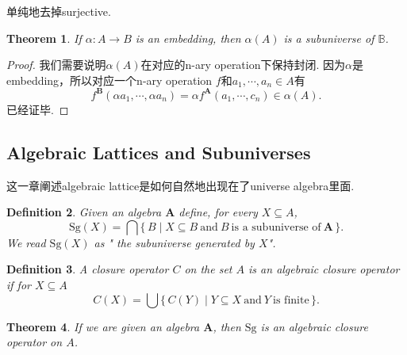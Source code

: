 \documentclass{article}
\newtheorem{theorem}{Theorem}[section]
\newtheorem{definition}[theorem]{Definition}
\newcommand*{\xfunc}[4]{{#2}\colon{#3}{#1}{#4}}
\newcommand*{\func}[3]{\xfunc{\to}{#1}{#2}{#3}}
\newcommand\Set[2]{\{\,#1\mid#2\,\}} %
\newcommand\Sg{\text{Sg}}
\begin{document}
{\color{blue} 单纯地去掉surjective.}

\begin{theorem}
\rm If $\func{\alpha}{A}{B}$ is an embedding, then $\alpha(A)$ is a subuniverse of $\mathbb{B}$.
\end{theorem}

\begin{proof}
我们需要说明$\alpha(A)$在对应的n-ary operation下保持封闭. 因为$\alpha$是embedding，所以对应一个n-ary operation $f$和$a_1,\cdots,a_n \in A$有
$$
f^\mathbf{B}(\alpha a_1,\cdots,\alpha a_n) = \alpha f^\mathbf{A}(a_1,\cdots,c_n) \in \alpha(A).
$$
已经证毕.
\end{proof}

\newpage
\subsection{Algebraic Lattices and Subuniverses}

{\color{red} 这一章阐述algebraic lattice是如何自然地出现在了universe algebra里面}.

\begin{definition}
\rm Given an algebra $\mathbf{A}$ define, for every $X \subseteq A$,
$$
\Sg(X) = \bigcap \Set{B}{X \subseteq B\ \text{and}\ B\ \text{is a subuniverse of}\ \mathbf{A}}.
$$ 
We read $\Sg(X)$ as "{\color{red} the subuniverse generated by $X$}".
\end{definition}

\begin{definition}
\rm A closure operator $C$ on the set $A$ is an {\color{red} algebraic closure  operator} if for $X \subseteq A$
$$
C(X) = \bigcup\Set{C(Y)}{Y \subseteq X\ \text{and}\ Y\ \text{is finite}}.
$$
\end{definition}

\begin{theorem}
\rm If we are given an algebra $\mathbf{A}$, then {\color{red} $\Sg$ is an algebraic closure operator} on $A$.
\end{theorem}
\end{document}

